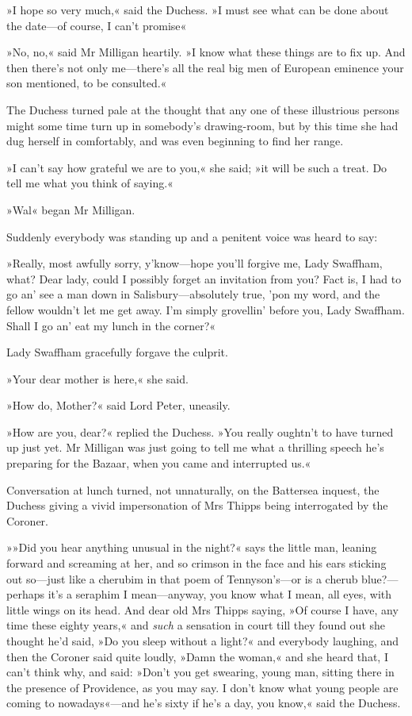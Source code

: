 »I hope so very much,« said the Duchess. »I must see what can be done about the date—of course, I can't promise\longdash«

»No, no,« said Mr Milligan heartily. »I know what these things are to fix up. And then there's not only me—there's all the real big men of European eminence your son mentioned, to be consulted.«

The Duchess turned pale at the thought that any one of these illustrious persons might some time turn up in somebody's drawing-room, but by this time she had dug herself in comfortably, and was even beginning to find her range.

»I can't say how grateful we are to you,« she said; »it will be such a treat. Do tell me what you think of saying.«

»Wal\longdash« began Mr Milligan.

Suddenly everybody was standing up and a penitent voice was heard to say:

»Really, most awfully sorry, y'know—hope you'll forgive me, Lady Swaffham, what? Dear lady, could I possibly forget an invitation from you? Fact is, I had to go an' see a man down in Salisbury—absolutely true, 'pon my word, and the fellow wouldn't let me get away. I'm simply grovellin' before you, Lady Swaffham. Shall I go an' eat my lunch in the corner?«

Lady Swaffham gracefully forgave the culprit.

»Your dear mother is here,« she said.

»How do, Mother?« said Lord Peter, uneasily.

»How are you, dear?« replied the Duchess. »You really oughtn't to have turned up just yet. Mr Milligan was just going to tell me what a thrilling speech he's preparing for the Bazaar, when you came and interrupted us.«

Conversation at lunch turned, not unnaturally, on the Battersea inquest, the Duchess giving a vivid impersonation of Mrs Thipps being interrogated by the Coroner.

»»Did you hear anything unusual in the night?« says the little man, leaning forward and screaming at her, and so crimson in the face and his ears sticking out so—just like a cherubim in that poem of Tennyson's—or is a cherub blue?---perhaps it's a seraphim I mean—anyway, you know what I mean, all eyes, with little wings on its head. And dear old Mrs Thipps saying, »Of course I have, any time these eighty years,« and \textit{such} a sensation in court till they found out she thought he'd said, »Do you sleep without a light?« and everybody laughing, and then the Coroner said quite loudly, »Damn the woman,« and she heard that, I can't think why, and said: »Don't you get swearing, young man, sitting there in the presence of Providence, as you may say. I don't know what young people are coming to nowadays«---and he's sixty if he's a day, you know,« said the Duchess.

